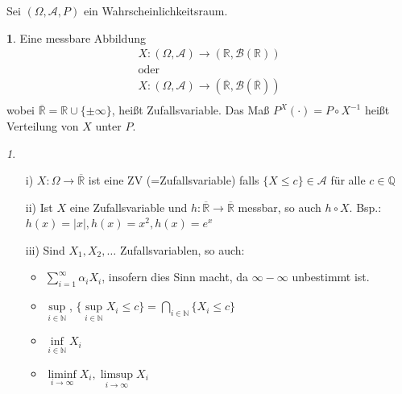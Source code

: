 \documentclass[10pt,a4paper]{report}
\numberwithin{equation}{section}
\numberwithin{figure}{section}
\theoremstyle{plain}
\theoremstyle{definition}
\newtheorem{defn}[thm]{\protect\definitionname}
\theoremstyle{remark}
\newtheorem{rem}[thm]{\protect\remarkname}
\theoremstyle{plain}
\providecommand{\definitionname}{Definition}
\providecommand{\remarkname}{Bemerkung}
\newcommand{\1}{ \mathbb{1} } %
\begin{document}
Sei $(\Omega,\mathcal{A},P)$ ein Wahrscheinlichkeitsraum.
\begin{defn} %
  Eine messbare Abbildung
  \begin{eqnarray*}
    X:(\Omega,\mathcal{A}) \to (\mathbb{R},\mathcal{B}(\mathbb{R}))\\
    \text{oder}\\
    X:(\Omega,\mathcal{A}) \to (\overline{\mathbb{R}},\mathcal{B}(\overline{\mathbb{R}}))\\
  \end{eqnarray*}
  wobei $\overline{\mathbb{R}}=\mathbb{R}\cup\{\pm \infty \}$, heißt Zufallsvariable. Das Maß $P^X(\cdot)=P\circ X^{-1}$ heißt Verteilung von $X$ unter $P$.
\end{defn}
\begin{rem}
  \begin{itemize}
  \item[i)] $X: \Omega \to \overline{\mathbb{R}}$ ist eine ZV (=Zufallsvariable) falls $\{X\leq c\} \in \mathcal{A}$ für alle $c \in \mathbb{Q}$
  \item[ii)] Ist $X$ eine Zufallsvariable und $h:\overline{\mathbb{R}} \to \overline{\mathbb{R}}$ messbar, so auch $h\circ X$. Bsp.:$h(x)=|x|, h(x)=x^2, h(x)=e^x$
  \item[iii)] Sind $X_1,X_2,\dots$ Zufallsvariablen, so auch:
    \begin{itemize}
    \item $\sum\limits_{i=1}^\infty \alpha_i X_i$, insofern dies Sinn
      macht, da $\infty-\infty$ unbestimmt ist.
    \item $\sup\limits_{i\in \mathbb{N}}$, $\{\sup\limits_{i \in
        \mathbb{N}} X_i \leq c\}=\bigcap\limits_{i \in
        \mathbb{N}}\{X_i \leq c\}$
    \item $\inf\limits_{i \in \mathbb{N}} X_i$
    \item $\liminf\limits_{i \to \infty} X_i, \limsup\limits_{i \to
        \infty} X_i$
    \end{itemize}
  \end{itemize}
  $ $
\end{rem}
\end{document}
